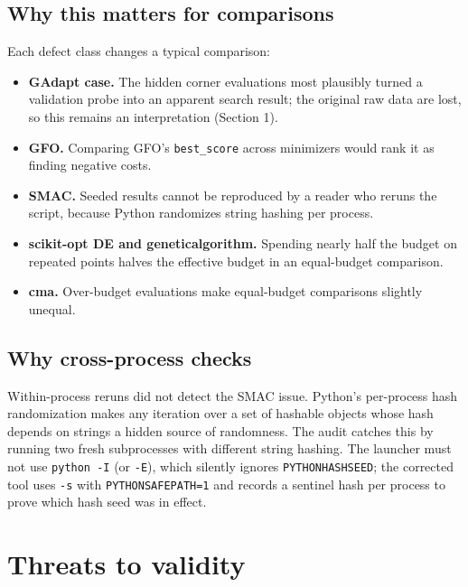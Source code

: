 \documentclass[acmsmall,screen,review,anonymous=false]{acmart}
\providecommand{\tightlist}{\setlength{\itemsep}{0pt}\setlength{\parskip}{0pt}}
\begin{document}
\subsection{Why this matters for comparisons}\label{why-this-matters-for-comparisons}

Each defect class changes a typical comparison:

\begin{itemize}
\tightlist
\item
  \textbf{GAdapt case.} The hidden corner evaluations most plausibly turned a validation probe into an apparent search
  result; the original raw data are lost, so this remains an interpretation (Section 1).
\item
  \textbf{GFO.} Comparing GFO's \texttt{best\_\allowbreak{}score} across minimizers would rank it as finding negative costs.
\item
  \textbf{SMAC.} Seeded results cannot be reproduced by a reader who reruns the script, because Python randomizes string
  hashing per process.
\item
  \textbf{scikit-opt DE and geneticalgorithm.} Spending nearly half the budget on repeated points halves the effective
  budget in an equal-budget comparison.
\item
  \textbf{cma.} Over-budget evaluations make equal-budget comparisons slightly unequal.
\end{itemize}

\subsection{Why cross-process checks}\label{why-cross-process-checks}

Within-process reruns did not detect the SMAC issue. Python's per-process hash randomization makes any iteration
over a set of hashable objects whose hash depends on strings a hidden source of randomness. The audit catches this by
running two fresh subprocesses with different string hashing. The launcher must not use \texttt{python\ -I} (or \texttt{-E}), which
silently ignores \texttt{PYTHONHASHSEED}; the corrected tool uses \texttt{-s} with \texttt{PYTHONSAFEPATH=1} and records a sentinel hash
per process to prove which hash seed was in effect.

\section{Threats to validity}\label{threats-to-validity}
\end{document}

